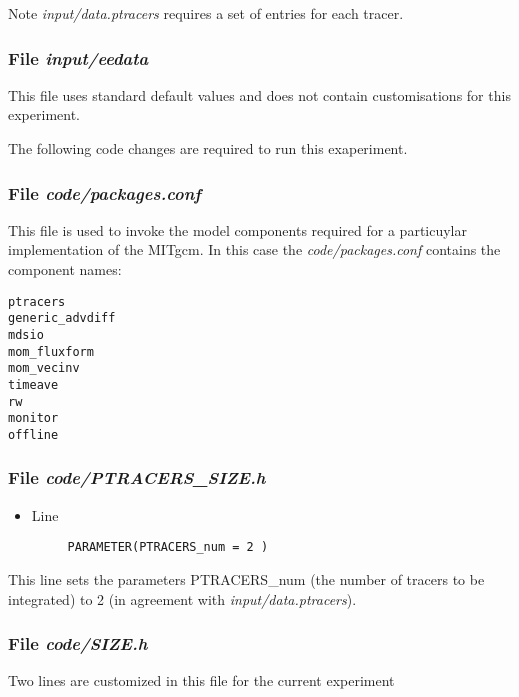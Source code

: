 \noindent Note {\it input/data.ptracers} requires a set of entries for
each tracer.

\subsubsection{File {\it input/eedata}}
\label{www:tutorials}
\noindent This file uses standard default values and does not contain
customisations for this experiment.

\noindent The following code changes are required to run this exaperiment. 

\subsubsection{File {\it code/packages.conf}}
\label{www:tutorials}

\noindent This file is used to invoke the model components required
for a particuylar implementation of the MITgcm. In this case the {\it
  code/packages.conf} contains the component names:

\begin {verbatim}
ptracers
generic_advdiff
mdsio
mom_fluxform
mom_vecinv
timeave
rw
monitor
offline
\end{verbatim}

\subsubsection{File {\it code/PTRACERS\_SIZE.h}}
\label{www:tutorials}
\begin{itemize}
\item Line
\begin{verbatim}
     PARAMETER(PTRACERS_num = 2 )
\end{verbatim}
\end{itemize}

\noindent This line sets the parameters PTRACERS\_num (the number of
tracers to be integrated) to 2 (in agreement with {\it
  input/data.ptracers}).

\subsubsection{File {\it code/SIZE.h}}
\label{www:tutorials}

\noindent Two lines are customized in this file for the current
experiment

